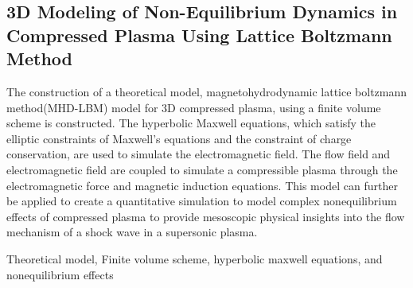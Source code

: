 \subsection{3D Modeling of Non-Equilibrium Dynamics in Compressed Plasma Using Lattice Boltzmann Method}
\par The construction of a theoretical model, magnetohydrodynamic lattice boltzmann method(MHD-LBM) model for 3D compressed plasma, using a finite volume scheme is constructed. The hyperbolic Maxwell equations, which satisfy the elliptic constraints of Maxwell's equations and the constraint of charge conservation, are used to simulate the electromagnetic field. The flow field and electromagnetic field are coupled to simulate a compressible plasma through the electromagnetic force and magnetic induction equations. This model can further be applied to create a quantitative simulation to model complex nonequilibrium effects of compressed plasma to provide mesoscopic physical insights into the flow mechanism of a shock wave in a supersonic plasma.
\par {Theoretical model, Finite volume scheme, hyperbolic maxwell equations, and nonequilibrium effects}

